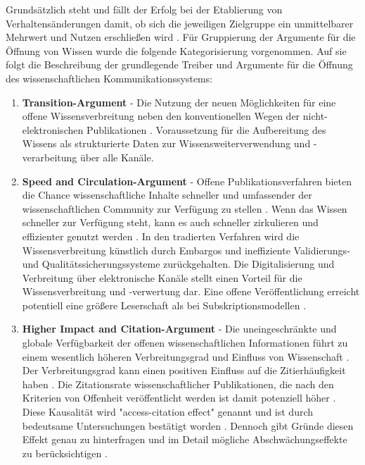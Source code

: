 Grundsätzlich steht und fällt der Erfolg bei der Etablierung von Verhaltensänderungen damit, ob sich die jeweiligen Zielgruppe ein unmittelbarer Mehrwert und Nutzen erschließen wird \cite{schulze_2013_open}. Für Gruppierung der Argumente für die Öffnung von Wissen wurde die folgende Kategorisierung vorgenommen. Auf sie folgt die Beschreibung der grundlegende Treiber und Argumente für die Öffnung des wissenschaftlichen Kommunikationssystems:
\begin{enumerate}
\item \textbf{Transition-Argument} - Die Nutzung der neuen Möglichkeiten für eine offene Wissensverbreitung neben den konventionellen Wegen der nicht-elektronischen Publikationen \cite{hall_2008_digitize} \cite{berliner_erklaerung_2003}. Voraussetzung für die Aufbereitung des Wissens als strukturierte Daten zur Wissensweiterverwendung und -verarbeitung über alle Kanäle.
\item \textbf{Speed and Circulation-Argument} - Offene Publikationsverfahren bieten die Chance wissenschaftliche Inhalte schneller und umfassender der wissenschaftlichen Community zur Verfügung zu stellen \cite{muller_2010_open}\cite{RIN_2010_open_research} \cite{hall_2008_digitize} \cite{EuropeanCommission_sciencepub_2006}. Wenn das Wissen schneller zur Verfügung steht, kann es auch schneller zirkulieren und effizienter genutzt werden \cite{Woelfle_2011}. In den tradierten Verfahren wird die Wissensverbreitung künstlich durch Embargos und ineffiziente Validierungs- und Qualitätssicherungssysteme zurückgehalten. Die Digitalisierung und Verbreitung über elektronische Kanäle stellt einen Vorteil für die Wissensverbreitung und -verwertung dar. Eine offene Veröffentlichung erreicht potentiell eine größere Leserschaft als bei Subskriptionsmodellen \cite{cope2014future}.
\item \textbf{Higher Impact and Citation-Argument} - Die uneingeschränkte und globale Verfügbarkeit der offenen wissenschaftlichen Informationen führt zu einem wesentlich höheren Verbreitungsgrad und Einfluss von Wissenschaft \cite{davis_2011_open} \cite{muller_2010_open} \cite{Baggs_2006} \cite{cite:5} \cite{Kurtz2005_oa_citation}. Der Verbreitungsgrad kann einen positiven Einfluss auf die Zitierhäufigkeit haben \cite{muller_2010_open} \cite{EuropeanCommission_sciencepub_2006} \cite{Hajjem_2005}. Die Zitationsrate wissenschaftlicher Publikationen, die nach den Kriterien von Offenheit veröffentlicht werden ist damit potenziell höher \cite{cite:21a}. Diese Kausalität wird "access-citation effect"\cite{davis_2011_open} genannt und ist durch bedeutsame Untersuchungen bestätigt worden \cite{Lawrence_2001} \cite{Jeffrey_2008} \cite{Hajjem_2005} \cite{Eysenbach_2006} \cite{Antelman_2004}. Dennoch gibt Gründe diesen Effekt genau zu hinterfragen und im Detail mögliche Abschwächungseffekte zu berücksichtigen \cite{davis_2011_open} \cite{davis_2008_open}.

\end{enumerate}
